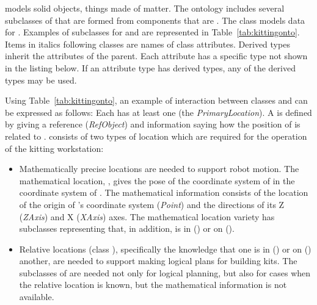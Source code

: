  models solid objects, things made of matter. The  ontology includes several subclasses of  that are formed from
components that are . The  class models data for . Examples of subclasses for  and  are represented in Table~\ref{tab:kittingonto}. Items in italics following classes are names of class attributes. Derived types inherit the attributes of the parent. Each attribute has a specific type not shown in the listing below. If an attribute type has derived types, any of the derived types may be used.

Using Table~\ref{tab:kittingonto}, an example of interaction between classes  and  can be expressed as follows: Each   has at least one  (the \textit{PrimaryLocation}). A  is defined by giving a reference   (\textit{RefObject}) and information saying how the position of  is related to .  consists of two types of location which are required for the operation of the kitting workstation:
\begin{itemize}
 \item Mathematically precise locations are needed to support robot motion. The mathematical location, , gives the pose of the coordinate system of  in the coordinate system of . The mathematical information consists of the location of the origin of 's coordinate system (\textit{Point}) and the directions of its Z (\textit{ZAxis}) and X (\textit{XAxis}) axes. The mathematical location variety has subclasses representing that, in addition,  is in  () or on  ().
\item Relative locations (class ), specifically the knowledge that one  is in () or on () another, are needed to support making logical plans for building kits. The subclasses of  are needed not only for
logical planning, but also for cases when the relative location is known, but the
mathematical information is not available.
\end{itemize}


